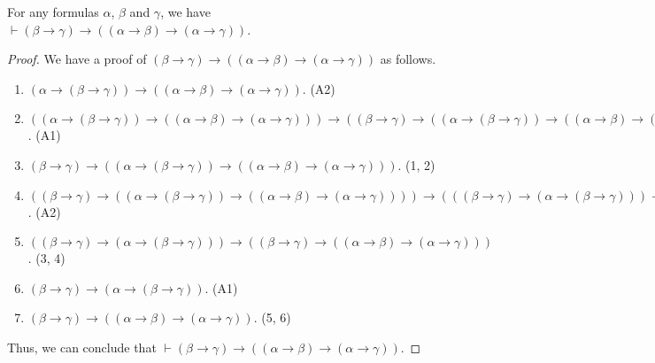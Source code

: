 \begin{theorem}
  \label{thm:syl}
  For any formulas $\alpha$, $\beta$ and $\gamma$, we have
  $\vdash (\beta \to \gamma) \to ((\alpha \to \beta) \to (\alpha \to \gamma))$.
\end{theorem}
\begin{proof}
  We have a proof of $(\beta \to \gamma) \to ((\alpha \to \beta) \to (\alpha
  \to \gamma))$ as follows.
  \begin{enumerate}[(1)]
    \item $(\alpha \to (\beta \to \gamma)) \to ((\alpha \to \beta) \to
    (\alpha \to \gamma))$. \hfill (A2)
    \item $((\alpha \to (\beta \to \gamma)) \to ((\alpha \to \beta) \to
    (\alpha \to \gamma))) \to ((\beta \to \gamma) \to ((\alpha \to (\beta \to
    \gamma)) \to ((\alpha \to \beta) \to (\alpha \to \gamma))))$. \hfill (A1)
    \item $(\beta \to \gamma) \to ((\alpha \to (\beta \to \gamma)) \to
    ((\alpha \to \beta) \to (\alpha \to \gamma)))$. \hfill (1, 2)
    \item $((\beta \to \gamma) \to ((\alpha \to (\beta \to \gamma)) \to
    ((\alpha \to \beta) \to (\alpha \to \gamma)))) \to (((\beta \to \gamma) \to
    (\alpha \to (\beta \to \gamma))) \to ((\beta \to \gamma) \to
    ((\alpha \to \beta) \to (\alpha \to \gamma))))$. \hfill (A2)
    \item $((\beta \to \gamma) \to (\alpha \to (\beta \to \gamma))) \to ((\beta
    \to \gamma) \to ((\alpha \to \beta) \to (\alpha \to \gamma)))$.
    \hfill (3, 4)
    \item $(\beta \to \gamma) \to (\alpha \to (\beta \to \gamma))$. \hfill (A1)
    \item $(\beta \to \gamma) \to ((\alpha \to \beta) \to
    (\alpha \to \gamma))$. \hfill (5, 6)
  \end{enumerate}
  Thus, we can conclude that
  $\vdash (\beta \to \gamma) \to ((\alpha \to \beta) \to (\alpha \to \gamma))$.
\end{proof}

